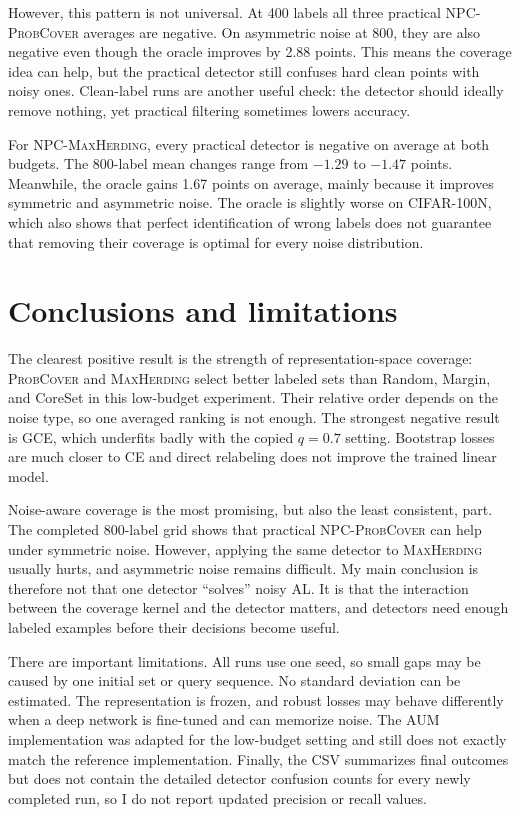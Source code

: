 \documentclass[10pt,twocolumn]{article}
\newcommand{\pc}{\textnormal{\textsc{ProbCover}}}
\newcommand{\mh}{\textnormal{\textsc{MaxHerding}}}
\newcommand{\npc}{\textnormal{\textsc{NPC}}}
\newcommand{\gce}{\textnormal{\textsc{GCE}}}
\begin{document}
However, this pattern is not universal. At 400 labels all three practical \npc{-\pc{}}
averages are negative. On asymmetric noise at 800, they are also negative even
though the oracle improves by 2.88 points. This means the coverage idea can
help, but the practical detector still confuses hard clean points with noisy
ones. Clean-label runs are another useful check: the detector should ideally
remove nothing, yet practical filtering sometimes lowers accuracy.

For \npc{-\mh{}}, every practical detector is negative on average at both
budgets. The 800-label mean changes range from $-1.29$ to $-1.47$ points.
Meanwhile, the oracle gains 1.67 points on average, mainly because it improves
symmetric and asymmetric noise. The oracle is slightly worse on CIFAR-100N,
which also shows that perfect identification of wrong labels does not guarantee
that removing their coverage is optimal for every noise distribution.

\section{Conclusions and limitations}

The clearest positive result is the strength of representation-space coverage:
\pc{} and \mh{} select better labeled sets than Random, Margin, and CoreSet in
this low-budget experiment. Their relative order depends on the noise type, so
one averaged ranking is not enough. The strongest negative result is \gce{},
which underfits badly with the copied $q=0.7$ setting. Bootstrap losses are much
closer to CE and direct relabeling does not improve the trained linear model.

Noise-aware coverage is the most promising, but also the least consistent, part.
The completed 800-label grid shows that practical \npc{-\pc{}} can help under
symmetric noise. However, applying the same detector to \mh{} usually hurts,
and asymmetric noise remains difficult. My main conclusion is therefore not
that one detector ``solves'' noisy AL. It is that the interaction between the
coverage kernel and the detector matters, and detectors need enough labeled
examples before their decisions become useful.

There are important limitations. All runs use one seed, so small gaps may be caused
by one initial set or query sequence. No standard deviation can be estimated.
The representation is frozen, and robust losses may behave differently when a
deep network is fine-tuned and can memorize noise. The AUM implementation was
adapted for the low-budget setting and still does not exactly match the
reference implementation. Finally, the CSV summarizes final outcomes but does
not contain the detailed detector confusion counts for every newly completed
run, so I do not report updated precision or recall values.
\end{document}
